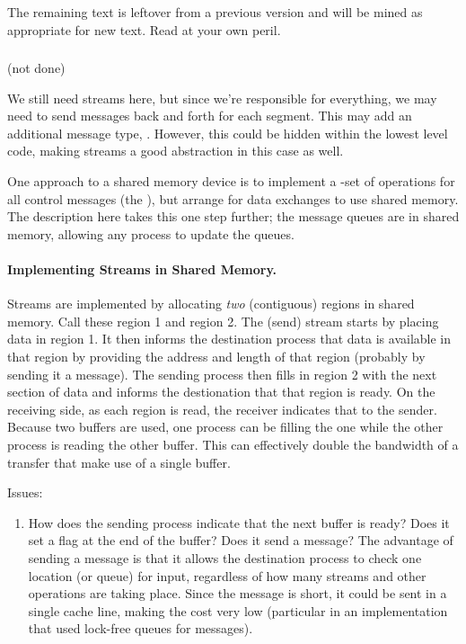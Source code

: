 \pagerule\par
The remaining text is leftover from a previous version and will be mined as
appropriate for new text.  Read at your own peril.

\pagerule\par

\subsubsection{\shmemname}
(not done)

We still need streams here, but since we're responsible for
everything, we may need to send messages back and forth for each
segment.  This may add an additional message type,
.  However, this could be hidden within the
lowest level code, making streams a good abstraction in this case as well.

One approach to a shared memory device is to implement a \tcpname-set of
operations for all control messages (the ), but
arrange for data exchanges to use shared memory.  The description here takes
this one step further; the message queues are in shared memory, allowing any
process to update the queues.

\paragraph{Implementing Streams in Shared Memory.}
Streams are implemented by allocating \emph{two} (contiguous) regions in
shared memory.  Call these region 1 and region 2.  The (send) stream starts by
placing data in region 1.  It then informs the destination process that data
is available in that region by providing the address and length of that
region (probably by sending it a message).  The sending process then fills in
region 2 with the next section of data and informs the destionation that that
region is ready.  On the receiving side, as each region is read, the receiver
indicates that to the sender.  Because two buffers are used, one process can
be filling the one while the other process is reading the other buffer.  This
can effectively double the bandwidth of a transfer that make use of a single
buffer.


Issues:
\begin{enumerate}
\item How does the sending process indicate that the next buffer is ready?
  Does it set a flag at the end of the buffer?  Does it send a message?  The
  advantage of sending a message is that it allows the destination process to
  check one location (or queue) for input, regardless of how many streams and
  other operations are taking place.  Since the message is short, it could be
  sent in a single cache line, making the cost very low (particular in an
  implementation that used lock-free queues for messages).  

\end{enumerate}


